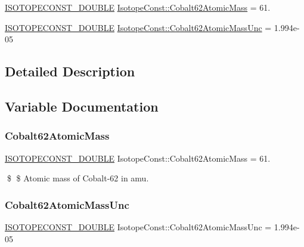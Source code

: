 \begin{DoxyCompactItemize}
\item 
\mbox{\hyperlink{group___isotope_const-_macros_ga8f45a7272ce02c0b4c65c44636ed719a}{I\+S\+O\+T\+O\+P\+E\+C\+O\+N\+S\+T\+\_\+\+D\+O\+U\+B\+LE}} \mbox{\hyperlink{group___isotope_const-_cobalt-_co62_ga3c4bd7f9d0a4a91427ba1451f0cad498}{Isotope\+Const\+::\+Cobalt62\+Atomic\+Mass}} = 61.
\item 
\mbox{\hyperlink{group___isotope_const-_macros_ga8f45a7272ce02c0b4c65c44636ed719a}{I\+S\+O\+T\+O\+P\+E\+C\+O\+N\+S\+T\+\_\+\+D\+O\+U\+B\+LE}} \mbox{\hyperlink{group___isotope_const-_cobalt-_co62_ga0f27e1b2bc146632af9194db3b664327}{Isotope\+Const\+::\+Cobalt62\+Atomic\+Mass\+Unc}} = 1.\+994e-\/05
\end{DoxyCompactItemize}


\subsection{Detailed Description}


\subsection{Variable Documentation}
\mbox{\label{group___isotope_const-_cobalt-_co62_ga3c4bd7f9d0a4a91427ba1451f0cad498}} 
\subsubsection{\texorpdfstring{Cobalt62\+Atomic\+Mass}{Cobalt62AtomicMass}}
{\footnotesize\ttfamily \mbox{\hyperlink{group___isotope_const-_macros_ga8f45a7272ce02c0b4c65c44636ed719a}{I\+S\+O\+T\+O\+P\+E\+C\+O\+N\+S\+T\+\_\+\+D\+O\+U\+B\+LE}} Isotope\+Const\+::\+Cobalt62\+Atomic\+Mass = 61.}

\$ \$ Atomic mass of Cobalt-\/62 in amu. \mbox{\label{group___isotope_const-_cobalt-_co62_ga0f27e1b2bc146632af9194db3b664327}} 
\subsubsection{\texorpdfstring{Cobalt62\+Atomic\+Mass\+Unc}{Cobalt62AtomicMassUnc}}
{\footnotesize\ttfamily \mbox{\hyperlink{group___isotope_const-_macros_ga8f45a7272ce02c0b4c65c44636ed719a}{I\+S\+O\+T\+O\+P\+E\+C\+O\+N\+S\+T\+\_\+\+D\+O\+U\+B\+LE}} Isotope\+Const\+::\+Cobalt62\+Atomic\+Mass\+Unc = 1.\+994e-\/05}


